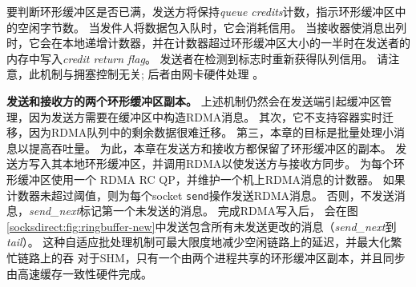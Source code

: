 要判断环形缓冲区是否已满，发送方将保持\textit {queue credits}计数，指示环形缓冲区中的空闲字节数。
当发件人将数据包入队时，它会消耗信用。 当接收器使消息出列时，它会在本地递增计数器，并在计数器超过环形缓冲区大小的一半时在发送者的内存中写入\textit {credit return flag}。 发送者在检测到标志时重新获得队列信用。
请注意，此机制与拥塞控制无关; 后者由网卡硬件处理 \cite {zhu2015congestion}。

\textbf {发送和接收方的两个环形缓冲区副本。}
上述机制仍然会在发送端引起缓冲区管理，因为发送方需要在缓冲区中构造RDMA消息。
其次，它不支持容器实时迁移，因为RDMA队列中的剩余数据很难迁移。
第三，本章的目标是批量处理小消息以提高吞吐量。
为此，本章在发送方和接收方都保留了环形缓冲区的副本。
发送方写入其本地环形缓冲区，并调用RDMA以使发送方与接收方同步。
\libipc{} 为每个环形缓冲区使用一个 RDMA RC QP，并维护一个机上RDMA消息的计数器。
如果计数器未超过阈值，则为每个socket \texttt {send}操作发送RDMA消息。
否则，不发送消息，\emph {send\_next}标记第一个未发送的消息。
完成RDMA写入后，\libipc{} 会在图 \ref {socksdirect:fig:ringbuffer-new}中发送包含所有未发送更改的消息（\emph {send\_next}到\emph {tail}）。
这种自适应批处理机制可最大限度地减少空闲链路上的延迟，并最大化繁忙链路上的吞
对于SHM，只有一个由两个进程共享的环形缓冲区副本，并且同步由高速缓存一致性硬件完成。



